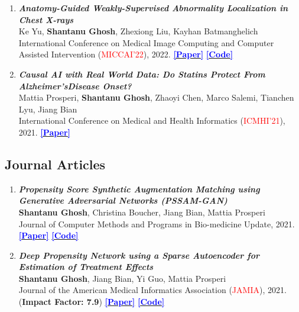 \documentclass[11pt,letter,sans]{moderncv}
\begin{document}
{\begin{enumerate}
        \item \textit{\textbf{Anatomy-Guided Weakly-Supervised Abnormality Localization in Chest X-rays}} 
        \\ Ke Yu, \textbf{Shantanu Ghosh}, Zhexiong Liu, Kayhan Batmanghelich
        \\ International Conference on Medical Image Computing and Computer Assisted Intervention (\textcolor{red}{MICCAI'22}), 2022. \href{https://arxiv.org/abs/2206.12704}
        {\textbf{\textcolor{blue}{[Paper]}}}
        \href{https://github.com/batmanlab/AGXNet}
        {\textbf{\textcolor{blue}{[Code]}}}
        
        \item \textit{\textbf{Causal AI with Real World Data:  Do Statins Protect From Alzheimer’sDisease Onset?}} 
        \\ Mattia Prosperi, \textbf{Shantanu Ghosh}, Zhaoyi Chen, Marco Salemi, Tianchen Lyu, Jiang Bian
        \\International Conference on Medical and Health Informatics (\textcolor{red}{ICMHI'21}), 2021. \href{https://drive.google.com/file/d/1rQkeW6QeqWp5Xo9HRgWaaIE846dgvKz4/view}
        {\textbf{\textcolor{blue}{[Paper]}}}
        \end{enumerate}
      } 
    

  \subsection{Journal Articles}
  \printbibliography[heading=none,type=article,keyword=journal,
    resetnumbers=true,prefixnumbers=J]
    \begin{enumerate}
        \item{\textit{\textbf{Propensity Score Synthetic Augmentation Matching using Generative Adversarial Networks (PSSAM-GAN)}}  
        \\\textbf{Shantanu Ghosh}, Christina Boucher, Jiang Bian, Mattia Prosperi
        \\Journal of Computer Methods and Programs in Bio-medicine Update, 2021}. \href{https://www.sciencedirect.com/science/article/pii/S2666990021000197/}
        {\textbf{\textcolor{blue}{[Paper]}}}
        \href{https://github.com/Shantanu48114860/PSSAM-GAN}
        {\textbf{\textcolor{blue}{[Code]}}}
        
        \item \textit{\textbf{Deep Propensity Network using a Sparse Autoencoder for Estimation of Treatment Effects}}
        \\\textbf{Shantanu Ghosh}, Jiang Bian, Yi Guo, Mattia Prosperi 
        \\Journal of the American Medical Informatics Association (\textcolor{red}{JAMIA}), 2021. (\textbf{Impact Factor: 7.9}) 
        \href{https://academic.oup.com/jamia/article-abstract/28/6/1197/6139936}
        {\textbf{\textcolor{blue}{[Paper]}}}
        \href{https://github.com/Shantanu48114860/DPN-SA}
        {\textbf{\textcolor{blue}{[Code]}}}
        
        
        
        \end{enumerate}
\end{document}
